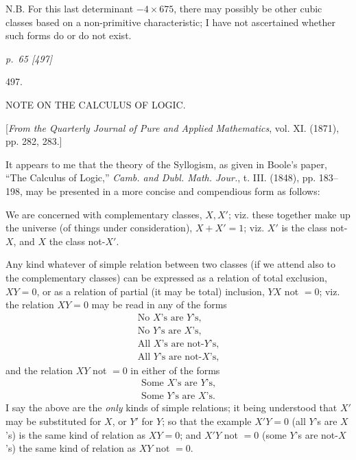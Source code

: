 ﻿\documentclass[11pt,a4paper]{article}
\theoremstyle{plain}
\theoremstyle{definition}
\begin{document}
\normalsize
\vspace{1.5em}

\noindent N.B. For this last determinant \(-4\times675\), there may possibly be other cubic classes
based on a non-primitive characteristic; I have not ascertained whether such forms do
or do not exist.

\clearpage
\textit{p.~65 [497]}

\normalsize
\vspace*{5em}
\begin{center}
{\Large 497.}

\vspace{2em}
{\large NOTE ON THE CALCULUS OF LOGIC.}

\vspace{2em}
[\textit{From the Quarterly Journal of Pure and Applied Mathematics}, vol. XI. (1871),\\
pp. 282, 283.]
\end{center}

\vspace{2em}

It appears to me that the theory of the Syllogism, as given in Boole's paper,
``The Calculus of Logic,'' \textit{Camb. and Dubl. Math. Jour.}, t. III. (1848), pp. 183--198,
may be presented in a more concise and compendious form as follows:

We are concerned with complementary classes, \(X, X'\); viz. these together make
up the universe (of things under consideration), \(X+X'=1\); viz. \(X'\) is the class
not-\(X\), and \(X\) the class not-\(X'\).

Any kind whatever of simple relation between two classes (if we attend also to
the complementary classes) can be expressed as a relation of total exclusion, \(XY=0\),
or as a relation of partial (it may be total) inclusion, \(YX\) not \(=0\); viz. the relation
\(XY=0\) may be read in any of the forms
\[
\begin{array}{c}
\text{No }X\text{'s are }Y\text{'s,}\\
\text{No }Y\text{'s are }X\text{'s,}\\
\text{All }X\text{'s are not-}Y\text{'s,}\\
\text{All }Y\text{'s are not-}X\text{'s,}
\end{array}
\]
and the relation \(XY\) not \(=0\) in either of the forms
\[
\begin{array}{c}
\text{Some }X\text{'s are }Y\text{'s,}\\
\text{Some }Y\text{'s are }X\text{'s.}
\end{array}
\]
I say the above are the \textit{only} kinds of simple relations; it being understood that
\(X'\) may be substituted for \(X\), or \(Y'\) for \(Y\); so that the example \(X'Y=0\) (all \(Y\)'s
are \(X\)'s) is the same kind of relation as \(XY=0\); and \(X'Y\) not \(=0\) (some \(Y\)'s are
not-\(X\)'s) the same kind of relation as \(XY\) not \(=0\).
\end{document}
